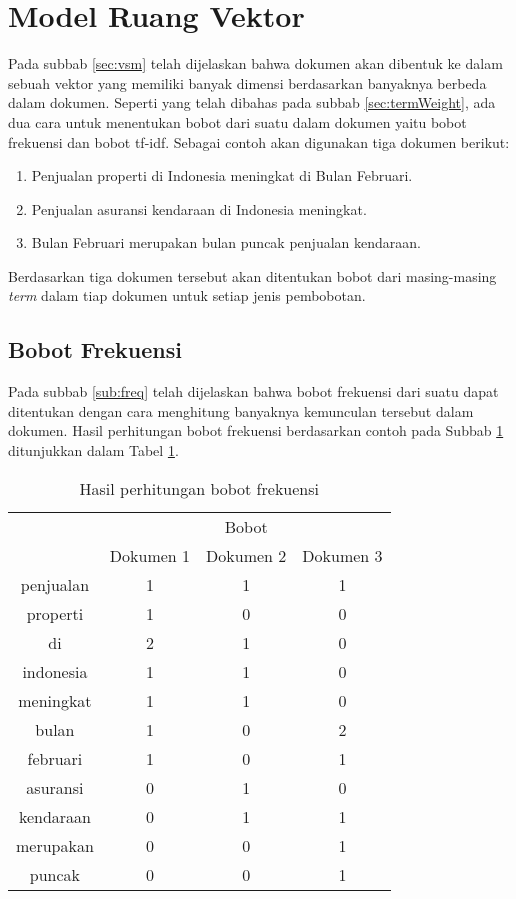 \section{Model Ruang Vektor}
\label{sec:analysis:vsm}
Pada subbab \ref{sec:vsm} telah dijelaskan bahwa dokumen akan dibentuk ke dalam sebuah vektor yang memiliki banyak dimensi berdasarkan banyaknya \term berbeda dalam dokumen. Seperti yang telah dibahas pada subbab \ref{sec:termWeight}, ada dua cara untuk menentukan bobot dari suatu \term dalam dokumen yaitu bobot frekuensi dan bobot tf-idf. Sebagai contoh akan digunakan tiga dokumen berikut:

\begin{enumerate}
	\item Penjualan properti di Indonesia meningkat di Bulan Februari.
	\item Penjualan asuransi kendaraan di Indonesia meningkat.
	\item Bulan Februari merupakan bulan puncak penjualan kendaraan.
\end{enumerate}

Berdasarkan tiga dokumen tersebut akan ditentukan bobot dari masing-masing \textit{term} dalam tiap dokumen untuk setiap jenis pembobotan.

\subsection{Bobot Frekuensi}
Pada subbab \ref{sub:freq} telah dijelaskan bahwa bobot frekuensi dari suatu \term dapat ditentukan dengan cara menghitung banyaknya kemunculan \term tersebut dalam dokumen. Hasil perhitungan bobot frekuensi berdasarkan contoh pada Subbab \ref{sec:analysis:vsm} ditunjukkan dalam Tabel \ref{tbl:freq}.

\begin{table}[h]
	\centering
	\begin{tabular}{|c|c|c|c|} \hline
		\multirow{2}{*}{\Term} & \multicolumn{3}{c|}{Bobot} \\ \cline{2-4}
		& Dokumen 1 & Dokumen 2 & Dokumen 3 \\ \hline 
        penjualan & 1 & 1 & 1 \\ \hline
        properti & 1 & 0 & 0 \\ \hline
        di & 2 & 1 & 0 \\ \hline
        indonesia & 1 & 1 & 0 \\ \hline
        meningkat & 1 & 1 & 0 \\ \hline
        bulan & 1 & 0 & 2 \\ \hline
        februari & 1 & 0 & 1 \\ \hline
        asuransi & 0 & 1 & 0 \\ \hline
        kendaraan & 0 & 1 & 1 \\ \hline
        merupakan & 0 & 0 & 1 \\ \hline
        puncak & 0 & 0 & 1 \\ \hline
	\end{tabular}
	\caption{Hasil perhitungan bobot frekuensi}
	\label{tbl:freq}
\end{table}

